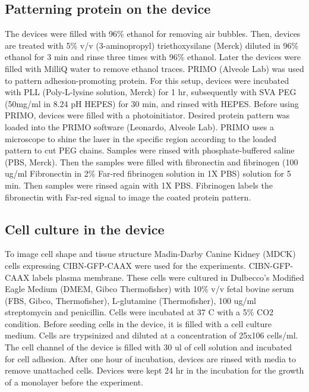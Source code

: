 \hypertarget{patterning-protein-on-the-device}{%
	\subsection{Patterning protein on the
		device}\label{patterning-protein-on-the-device}}

The devices were filled with 96\% ethanol for removing air bubbles.
Then, devices are treated with 5\% v/v (3-aminopropyl) triethoxysilane
(Merck) diluted in 96\% ethanol for 3 min and rinse three times with
96\% ethanol. Later the devices were filled with MilliQ water to remove
ethanol traces. PRIMO (Alveole Lab) was used to pattern
adhesion-promoting protein. For this setup, devices were incubated with
PLL (Poly-L-lysine solution, Merck) for 1 hr, subsequently with SVA PEG
(50mg/ml in 8.24 pH HEPES) for 30 min, and rinsed with HEPES. Before
using PRIMO, devices were filled with a photoinitiator. Desired protein
pattern was loaded into the PRIMO software (Leonardo, Alveole Lab).
PRIMO uses a microscope to shine the laser in the specific region
according to the loaded pattern to cut PEG chains. Samples were rinsed
with phosphate-buffered saline (PBS, Merck). Then the samples were
filled with fibronectin and fibrinogen (100 ug/ml Fibronectin in 2\%
Far-red fibrinogen solution in 1X PBS) solution for 5 min. Then samples
were rinsed again with 1X PBS. Fibrinogen labels the fibronectin with
Far-red signal to image the coated protein pattern.

\hypertarget{cell-culture-in-the-device}{%
	\subsection{Cell culture in the
		device}\label{cell-culture-in-the-device}}

To image cell shape and tissue structure Madin-Darby Canine Kidney
(MDCK) cells expressing CIBN-GFP-CAAX were used for the experiments.
CIBN-GFP-CAAX labels plasma membrane. These cells were cultured in
Dulbecco's Modified Eagle Medium (DMEM, Gibco Thermofisher) with 10\%
v/v fetal bovine serum (FBS, Gibco, Thermofisher), L-glutamine
(Thermofisher), 100 ug/ml streptomycin and penicillin. Cells were
incubated at 37 C with a 5\% CO2 condition. Before seeding cells in the
device, it is filled with a cell culture medium. Cells are trypsinized
and diluted at a concentration of 25x106 cells/ml. The cell channel of
the device is filled with 30 ul of cell solution and incubated for cell
adhesion. After one hour of incubation, devices are rinsed with media to
remove unattached cells. Devices were kept 24 hr in the incubation for
the growth of a monolayer before the experiment.

